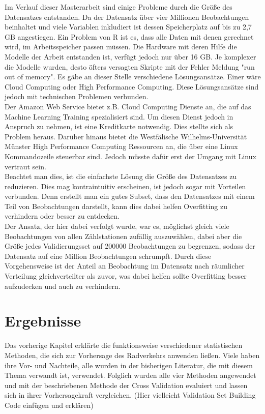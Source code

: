 \documentclass[a4paper,12pt]{thesis}
\begin{document}
Im Verlauf dieser Masterarbeit sind einige Probleme durch die Größe des Datensatzes entstanden. Da der Datensatz über vier Millionen Beobachtungen beinhaltet und viele Variablen inkludiert ist dessen Speicherplatz auf bis zu 2,7 GB angestiegen. Ein Problem von R ist es, dass alle Daten mit denen gerechnet wird, im Arbeitsspeicher passen müssen. Die Hardware mit deren Hilfe die Modelle der Arbeit entstanden ist, verfügt jedoch nur über 16 GB. Je komplexer die Modelle wurden, desto öfters versagten Skripte mit der Fehler Meldung "run out of memory". Es gäbe an dieser Stelle verschiedene Lösungsansätze. Einer wäre Cloud Computing oder High Performance Computing. Diese Lösungsansätze sind jedoch mit technischen Problemen verbunden.\\ 
Der Amazon Web Service bietet z.B. Cloud Computing Dienste an, die auf das Machine Learning Training spezialisiert sind. Um diesen Dienst jedoch in Anspruch zu nehmen, ist eine Kreditkarte notwendig. Dies stellte sich als Problem heraus. Darüber hinaus bietet die Westfälische Wilhelms-Universität Münster High Performance Computing Ressourcen an, die über eine Linux Kommandozeile steuerbar sind. Jedoch müsste dafür erst der Umgang mit Linux vertraut sein.\\
Beachtet man dies, ist die einfachste Lösung die Größe des Datensatzes zu reduzieren. Dies mag kontraintuitiv erscheinen, ist jedoch sogar mit Vorteilen verbunden. Denn erstellt man ein gutes Subset, dass den Datensatzes mit einem Teil von Beobachtungen darstellt, kann dies dabei helfen Overfitting zu verhindern oder besser zu entdecken.\\
Der Ansatz, der hier dabei verfolgt wurde, war es, möglichst gleich viele Beobachtungen von allen Zählstationen zufällig auszuwählen, dabei aber die Größe jedes Validierungsset auf 200000 Beobachtungen zu begrenzen, sodass der Datensatz auf eine Million Beobachtungen schrumpft. Durch diese Vorgehensweise ist der Anteil an Beobachtung im Datensatz nach räumlicher Verteilung gleichverteilter als zuvor, was dabei helfen sollte Overfitting besser aufzudecken und auch zu verhindern.

\chapter{Ergebnisse}

Das vorherige Kapitel erklärte die funktionsweise verschiedener statistischen Methoden, die sich zur Vorhersage des Radverkehrs anwenden ließen. Viele haben ihre Vor- und Nachteile, alle wurden in der bisherigen Literatur, die mit diesem Thema verwandt ist, verwendet. Folglich wurden alle vier Methoden angewendet und mit der beschriebenen Methode der Cross Validation evaluiert und lassen sich in ihrer Vorhersagekraft vergleichen. (Hier vielleicht Validation Set Building Code einfügen und erklären)
\end{document}
